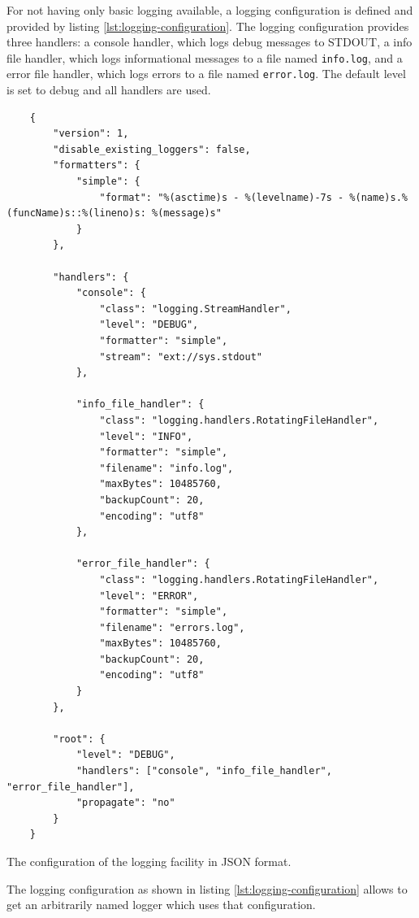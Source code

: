 \documentclass[10pt, openright, notitlepage]{scrreprt}
\begin{document}
For not having only basic logging available, a logging configuration is defined
and provided by listing \ref{lst:logging-configuration}. The logging configuration
provides three handlers: a console handler, which logs debug messages to STDOUT,
a info file handler, which logs informational messages to a file named
\texttt{info.log}, and a error file handler, which logs errors to a file
named \texttt{error.log}. The default level is set to debug and all handlers
are used.

\begin{listing}[H]
\begin{verbatim}
    {
        "version": 1,
        "disable_existing_loggers": false,
        "formatters": {
            "simple": {
                "format": "%(asctime)s - %(levelname)-7s - %(name)s.%(funcName)s::%(lineno)s: %(message)s"
            }
        },
    
        "handlers": {
            "console": {
                "class": "logging.StreamHandler",
                "level": "DEBUG",
                "formatter": "simple",
                "stream": "ext://sys.stdout"
            },
    
            "info_file_handler": {
                "class": "logging.handlers.RotatingFileHandler",
                "level": "INFO",
                "formatter": "simple",
                "filename": "info.log",
                "maxBytes": 10485760,
                "backupCount": 20,
                "encoding": "utf8"
            },
    
            "error_file_handler": {
                "class": "logging.handlers.RotatingFileHandler",
                "level": "ERROR",
                "formatter": "simple",
                "filename": "errors.log",
                "maxBytes": 10485760,
                "backupCount": 20,
                "encoding": "utf8"
            }
        },
    
        "root": {
            "level": "DEBUG",
            "handlers": ["console", "info_file_handler", "error_file_handler"],
            "propagate": "no"
        }
    }
\end{verbatim}
\caption{\label{lst:logging-configuration}
The configuration of the logging facility in JSON format.}
\end{listing}

The logging configuration as shown in listing \ref{lst:logging-configuration} allows
to get an arbitrarily named logger which uses that configuration.
\end{document}
